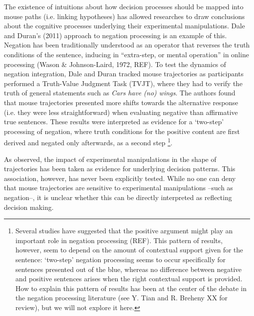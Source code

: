 \documentclass{article}
\begin{document}
The existence of intuitions about how decision processes should be mapped into mouse paths (i.e. linking hypotheses) has allowed researches to draw conclusions about the cognitive processes underlying their experimental manipulations. Dale and Duran's (2011) approach to negation processing is an example of this.   
Negation has been traditionally understood as an operator that reverses the truth conditions of the sentence, inducing in ``extra-step, or mental operation'' in online processing (Wason \& Johnson-Laird, 1972, REF). %
To test the dynamics of negation integration, Dale and Duran tracked mouse trajectories as participants performed a Truth-Value Judgment Task (TVJT), where they had to verify the truth of general statements such as \textit{Cars have (no) wings}.
%
The authors found that mouse trajectories presented more shifts towards the alternative response (i.e. they were less straightforward) when evaluating negative than affirmative true sentences. These results were interpreted as evidence for a `two-step' processing of negation, where truth conditions for the positive content are first derived and negated only afterwards, as a second step%
%
\footnote{Several studies have suggested that the positive argument might play an important role in negation processing (REF).  
This pattern of results, however, seem to depend on the amount of contextual support given for the sentence: `two-step'  negation processing seems to occur specifically for sentences presented out of the blue, whereas no difference between negative and positive sentences arises when the right contextual support is provided. How to explain this pattern of results has been at the center of the debate in the negation processing literature (see Y. Tian and R. Breheny XX for review), but we will not explore it here.}.

As observed, the impact of experimental manipulations in the shape of trajectories has been taken as evidence for underlying decision patterns. This association, however, has never been explicitly tested. While no one can deny that mouse trajectories are sensitive to experimental manipulations --such as negation--, it is unclear whether this can be directly interpreted as reflecting decision making. 
\end{document}
